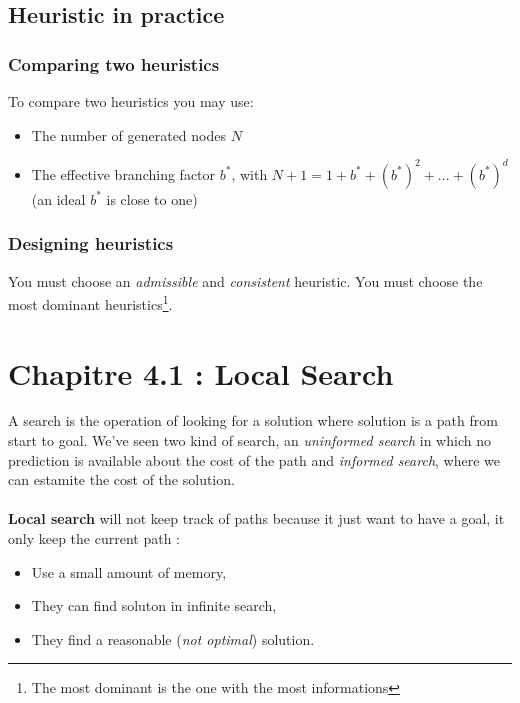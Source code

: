 \subsection{Heuristic in practice}

\subsubsection{Comparing two heuristics}

To compare two heuristics you may use:
\begin{itemize}
\item The number of generated nodes $N$
\item The effective branching factor $b^*$, with $N+1 = 1 + b^* + (b^*)^2 + ... + (b^*)^d$ (an ideal $b^*$ is close to one)
\end{itemize}

\subsubsection{Designing heuristics}

You must choose an \textit{admissible} and \textit{consistent} heuristic. You must choose the most dominant heuristics\footnote{The most dominant is the one with the most informations}. 




\section{Chapitre 4.1 : Local Search}

A search  is the operation of  looking for a solution  where solution is
a  path  from  start  to  goal.  We've  seen  two  kind  of  search,  an
\textit{uninformed search} in which no prediction is available about the
cost of the path and \textit{informed search}, where we can estamite
the cost of the solution.

\paragraph{ }
\textbf{Local search} will not keep track of paths because it just want
to have a goal, it only keep the current path :
\begin{itemize}
    \item Use a small amount of memory,
    \item They can find soluton in infinite search,
    \item They find a reasonable (\textit{not optimal}) solution.
\end{itemize}

